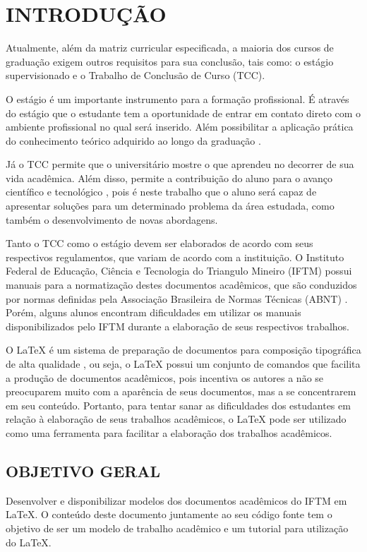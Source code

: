 \newpage
\section{INTRODUÇÃO}


\indent Atualmente, além da matriz curricular especificada, a maioria dos cursos de graduação exigem outros requisitos para sua conclusão, tais como: o estágio supervisionado e o Trabalho de Conclusão de Curso (TCC).

O estágio é um importante instrumento para a formação profissional. É através do estágio que o estudante tem a oportunidade de entrar em contato direto com o ambiente profissional no qual será inserido. Além possibilitar a aplicação prática do conhecimento teórico adquirido ao longo da graduação \cite{Piccinini2012}.

Já o TCC permite que o universitário mostre o que aprendeu no decorrer de sua vida acadêmica. Além disso, permite a contribuição do aluno para o avanço científico e tecnológico \cite{Pereira2009}, pois é neste trabalho que o aluno será capaz de apresentar soluções para um determinado problema da área estudada, como também o desenvolvimento de novas abordagens.

Tanto o TCC como o estágio devem ser elaborados de acordo com seus respectivos regulamentos, que variam de acordo com a instituição. O Instituto Federal de Educação, Ciência e Tecnologia do Triangulo Mineiro (IFTM) possui manuais para a normatização destes documentos acadêmicos, que são conduzidos por normas definidas pela Associação Brasileira de Normas Técnicas (ABNT) \cite{manualTCC,manualEstagio}. Porém, alguns alunos encontram dificuldades em utilizar os manuais disponibilizados pelo IFTM durante a elaboração de seus respectivos trabalhos.

O LaTeX é um sistema de preparação de documentos para composição tipográfica de alta qualidade \cite{LATEX2018}, ou seja, o LaTeX possui um conjunto de comandos que facilita a produção de documentos acadêmicos, pois incentiva os autores a não se preocuparem muito com a aparência de seus documentos, mas a se concentrarem em seu conteúdo. Portanto, para tentar sanar as dificuldades dos estudantes em relação à elaboração de seus trabalhos acadêmicos, o LaTeX pode ser utilizado como uma ferramenta para facilitar a elaboração dos trabalhos acadêmicos.

\subsection{OBJETIVO GERAL}
Desenvolver e disponibilizar modelos dos documentos acadêmicos do IFTM em LaTeX. O conteúdo deste documento juntamente ao seu código fonte tem o objetivo de ser um modelo de trabalho acadêmico e um tutorial para utilização do LaTeX.

